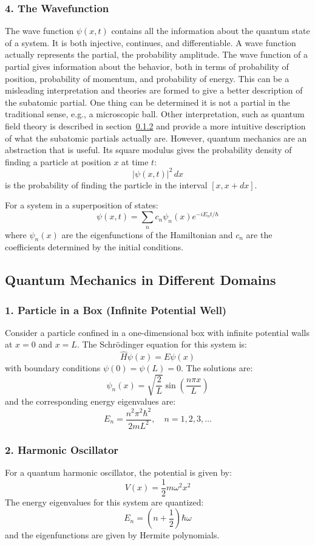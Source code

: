 \subsubsection{4. The Wavefunction}
The wave function $\psi(x,t)$ contains all the information about the quantum state of a system. 
It is both injective, continues, and differentiable.
A wave function actually represents the partial, the probability amplitude. The wave function 
of a partial gives information about the behavior, both in terms of probability of position,
probability of momentum, and probability of energy. This can be a misleading interpretation
and theories are formed to give a better description of the subatomic partial. One thing 
can be determined it is not a partial in the traditional sense, e.g., a microscopic ball. 
Other interpretation, such as quantum field theory is described in section~\ref{} and provide 
a more intuitive description of what the subatomic partials actually are. However, quantum
mechanics are an abstraction that is useful.
Its square modulus gives the probability density of finding a particle at position $x$ at time $t$:
\[
|\psi(x,t)|^2 \, dx
\]
is the probability of finding the particle in the interval $[x, x+dx]$.

For a system in a superposition of states:
\[
\psi(x,t) = \sum_{n} c_n \psi_n(x) e^{-i E_n t / \hbar}
\]
where $\psi_n(x)$ are the eigenfunctions of the Hamiltonian and $c_n$ are the coefficients determined by the initial conditions.

\subsection{Quantum Mechanics in Different Domains}
\subsubsection{1. Particle in a Box (Infinite Potential Well)}
Consider a particle confined in a one-dimensional box with infinite potential walls at $x = 0$ and $x = L$. The Schrödinger equation for this system is:
\[
\hat{H} \psi(x) = E \psi(x)
\]
with boundary conditions $\psi(0) = \psi(L) = 0$. The solutions are:
\[
\psi_n(x) = \sqrt{\frac{2}{L}} \sin \left( \frac{n\pi x}{L} \right)
\]
and the corresponding energy eigenvalues are:
\[
E_n = \frac{n^2 \pi^2 \hbar^2}{2mL^2}, \quad n = 1, 2, 3, \dots
\]

\subsubsection{2. Harmonic Oscillator}
For a quantum harmonic oscillator, the potential is given by:
\[
V(x) = \frac{1}{2} m \omega^2 x^2
\]
The energy eigenvalues for this system are quantized:
\[
E_n = \left( n + \frac{1}{2} \right) \hbar \omega
\]
and the eigenfunctions are given by Hermite polynomials.

